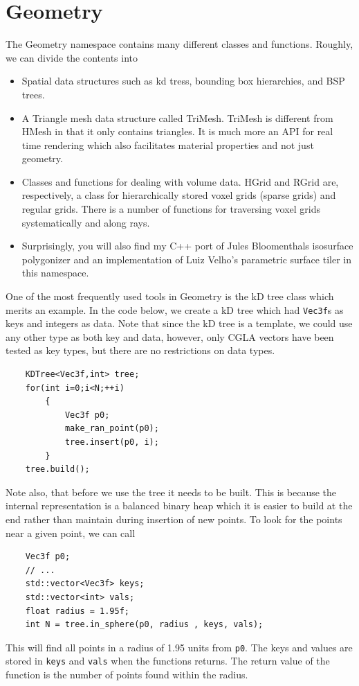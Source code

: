 \documentclass[a4paper]{article}
\begin{document}
\section{Geometry}
%
%
The Geometry namespace contains many different classes and functions. Roughly, we can divide the contents into
\begin{itemize}
\item Spatial data structures such as kd tress, bounding box hierarchies, and BSP trees.
\item A Triangle mesh data structure called TriMesh. TriMesh is different from HMesh in that it only contains triangles. It is much more an API for real time rendering which also facilitates material properties and not just geometry.
\item Classes and functions for dealing with volume data. HGrid and RGrid are, respectively, a class for hierarchically stored voxel grids (sparse grids) and regular grids. There is a number of functions for traversing voxel grids systematically and along rays.
\item Surprisingly, you will also find my C++ port of Jules Bloomenthals isosurface polygonizer and an implementation of Luiz Velho's parametric surface tiler in this namespace.
\end{itemize}
One of the most frequently used tools in Geometry is the kD tree class which merits an example. In the code below, we create a kD tree which had \texttt{Vec3f}s as keys and integers as data. Note that since the kD tree is a template, we could use any other type as both key and data, however, only CGLA vectors have been tested as key types, but there are no restrictions on data types.
\begin{verbatim}
    KDTree<Vec3f,int> tree;
    for(int i=0;i<N;++i)
        {
            Vec3f p0;
            make_ran_point(p0);
            tree.insert(p0, i);
        }
    tree.build();
\end{verbatim}
Note also, that before we use the tree it needs to be built. This is because the internal representation is a balanced binary heap which it is easier to build at the end rather than maintain during insertion of new points. To look for the points near a given point, we can call
\begin{verbatim}
    Vec3f p0;
    // ...
    std::vector<Vec3f> keys;
    std::vector<int> vals;
    float radius = 1.95f;
    int N = tree.in_sphere(p0, radius , keys, vals);
\end{verbatim}
This will find all points in a radius of 1.95 units from \texttt{p0}. The keys and values are stored in \texttt{keys} and \texttt{vals} when the functions returns. The return value of the function is the number of points found within the radius. 
\end{document}

